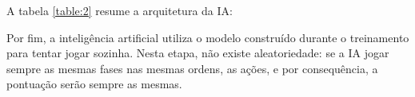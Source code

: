 A tabela \ref{table:2} resume a arquitetura da IA:

Por fim, a inteligência artificial utiliza o modelo construído durante o treinamento para tentar jogar sozinha. Nesta etapa, não existe aleatoriedade: se a IA jogar sempre as mesmas fases nas mesmas ordens, as ações, e por consequência, a pontuação serão sempre as mesmas.

%


